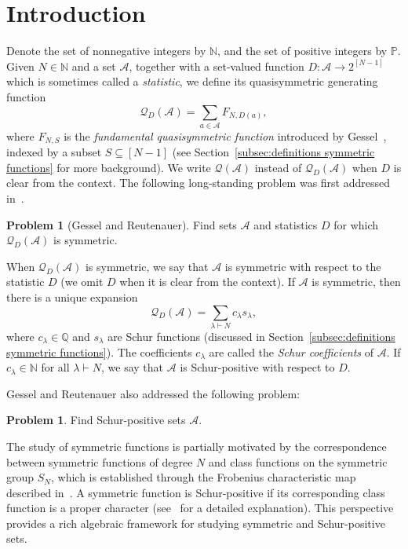 \documentclass[11pt]{article}
\theoremstyle{definition}
\numberwithin{equation}{section}
\newtheorem{problem}[theo]{Problem}
\newcommand{\NN}{\mathbb{N}}
\newcommand{\QQ}{\mathbb{Q}}
\newcommand{\PP}{\mathbb{P}}
\newcommand{\Q}{\mathcal{Q}}
\newcommand{\A}{\mathcal{A}}
\begin{document}
\section{Introduction}
\label{sec:introduction}

Denote the set of nonnegative integers by $\NN$, and the set of positive integers by $\PP$. Given $N\in \NN$ and a set $\A$, together with a set-valued function $D:\A\to 2^{[N-1]}$ which is sometimes called a \emph{statistic}, we define its quasisymmetric generating function
\[
    \Q_{D} (\A) = \sum_{a \in \A} F_{N, D(a)},
\]
where $F_{N, S}$ is the \emph{fundamental quasisymmetric function} introduced by Gessel~\cite{knuth_classes_schur_positive}, indexed by a subset $S \subseteq [N-1]$ (see Section~\ref{subsec:definitions symmetric functions} for more background). We write $\Q(\A)$ instead of $\Q_{D}(\A)$ when $D$ is clear from the context.
The following long-standing problem was first addressed in~\cite{gessel1993counting}.
\begin{problem}[Gessel and Reutenauer]
    Find sets $\A$ and statistics $D$ for which $\Q_{D}(\A)$ is symmetric.
\end{problem}

When $\Q_{D}(\A)$ is symmetric, we say that $\A$ is symmetric with respect to the statistic $D$ (we omit $D$ when it is clear from the context). If $\A$ is symmetric, then there is a unique expansion
\[
    \Q_{D} (\A) = \sum_{\lambda \vdash N} c_\lambda s_\lambda,
\]
where $c_\lambda \in \QQ$ and $s_\lambda$ are Schur functions (discussed in Section~\ref{subsec:definitions symmetric functions}). The coefficients $c_\lambda$ are called the \emph{Schur coefficients} of $\A$.
If $c_\lambda \in \NN$ for all $\lambda \vdash N$, we say that $\A$ is Schur-positive with respect to $D$.

Gessel and Reutenauer also addressed the following problem:
\begin{problem}
    Find Schur-positive sets $\A$.
\end{problem}






The study of symmetric functions is partially motivated by the correspondence between symmetric functions of degree $N$ and class functions on the symmetric group $S_N$, which is established through the Frobenius characteristic map described in~\cite[Chapter 4.7]{sagan_book}. A symmetric function is Schur-positive if its corresponding class function is a proper character (see~\cite{adin_roichman_fine_set} for a detailed explanation). This perspective provides a rich algebraic framework for studying symmetric and Schur-positive sets.
\end{document}
